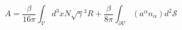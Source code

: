\begin{equation}
A = \frac{\beta}{16\pi}\int_{\mathcal{V}}d^3 x N\sqrt{\gamma}{}^3R+
 \frac{\beta}{8\pi} \int_{\partial\mathcal{V}} (a^\alpha n_\alpha) d^2\mathcal{S}
\end{equation}

